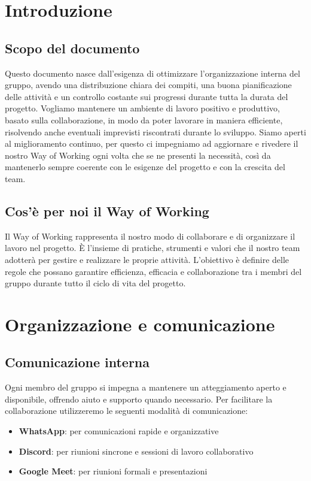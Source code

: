 \documentclass[11pt,a4paper]{article}
\begin{document}
\tableofcontents
\newpage

\section{Introduzione}
\subsection{Scopo del documento}
Questo documento nasce dall’esigenza di ottimizzare l’organizzazione interna del gruppo, avendo una distribuzione chiara dei compiti, una buona pianificazione delle attività e un controllo costante sui progressi durante tutta la durata del progetto. Vogliamo mantenere un ambiente di
lavoro positivo e produttivo, basato sulla collaborazione, in modo da poter lavorare in maniera efficiente, risolvendo anche eventuali imprevisti riscontrati durante lo sviluppo.
Siamo aperti al miglioramento continuo, per questo ci impegniamo ad aggiornare e rivedere il nostro Way of Working ogni volta che se ne presenti la necessità, così da mantenerlo sempre coerente con le esigenze del progetto e con la crescita del team.

\subsection{Cos'è per noi il Way of Working}
Il Way of Working rappresenta il nostro modo di collaborare e di organizzare il lavoro nel progetto. È l’insieme di pratiche, strumenti e valori che il nostro team adotterà per gestire e realizzare le proprie attività. L’obiettivo è definire delle regole che possano garantire efficienza, efficacia e collaborazione tra i membri del gruppo durante tutto il ciclo di vita del progetto.

\newpage

\section{Organizzazione e comunicazione}

\subsection{Comunicazione interna}
Ogni membro del gruppo si impegna a mantenere un atteggiamento aperto e disponibile, offrendo aiuto e supporto quando necessario. Per facilitare la collaborazione utilizzeremo le seguenti modalità di comunicazione:
\begin{itemize}
    \item \textbf{WhatsApp}: per comunicazioni rapide e organizzative
    \item \textbf{Discord}: per riunioni sincrone e sessioni di lavoro collaborativo
    \item \textbf{Google Meet}: per riunioni formali e presentazioni
\end{itemize}
\end{document}
